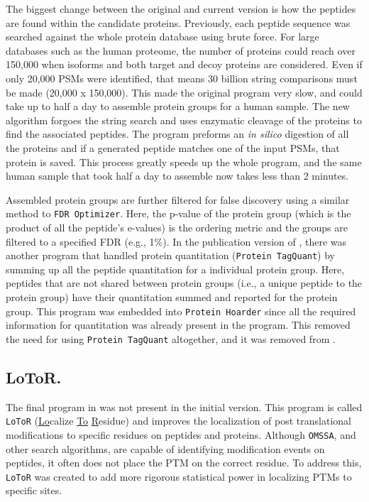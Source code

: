 The biggest change between the original and current version is how the peptides are found within the candidate proteins. Previously, each peptide sequence was searched against the whole protein database using brute force. For large databases such as the human proteome, the number of proteins could reach over 150,000 when isoforms and both target and decoy proteins are considered. Even if only 20,000 PSMs were identified, that means 30 billion string comparisons must be made (20,000 x 150,000). This made the original program very slow, and could take up to half a day to assemble protein groups for a human sample. The new algorithm forgoes the string search and uses enzymatic cleavage of the proteins to find the associated peptides. The program preforms an \emph{in silico} digestion of all the proteins and if a generated peptide matches one of the input PSMs, that protein is saved. This process greatly speeds up the whole program, and the same human sample that took half a day to assemble now takes less than 2 minutes. 

Assembled protein groups are further filtered for false discovery using a similar method to \texttt{FDR Optimizer}. Here, the p-value of the protein group (which is the product of all the peptide's e-values) is the ordering metric and the groups are filtered to a specified FDR (e.g., 1\%). In the publication version of \compass{}, there was another program that handled protein quantitation (\texttt{Protein TagQuant}) by summing up all the peptide quantitation for a individual protein group. Here, peptides that are not shared between protein groups (i.e., a unique peptide to the protein group) have their quantitation summed and reported for the protein group. This program was embedded into \texttt{Protein Hoarder} since all the required information for quantitation was already present in the program. This removed the need for using \texttt{Protein TagQuant} altogether, and it was removed from \compass{}. 

\subsection*{LoToR.}
The final program in \compass{} was not present in the initial version. This program is called \texttt{LoToR} (\underline{Lo}calize \underline{To} \underline{R}esidue) and improves the localization of post translational modifications to specific residues on peptides and proteins. Although \texttt{OMSSA}, and other search algorithms, are capable of identifying modification events on peptides, it often does not place the PTM on the correct residue. To address this, \texttt{LoToR} was created to add more rigorous statistical power in localizing PTMs to specific sites. 

